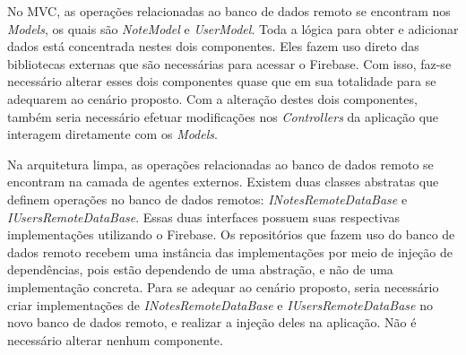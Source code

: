 No MVC, as operações relacionadas ao banco de dados remoto se encontram nos \emph{Models}, os quais são \emph{NoteModel} e \emph{UserModel}.
Toda a lógica para obter e adicionar dados está concentrada nestes dois componentes.
Eles fazem uso direto das bibliotecas externas que são necessárias para acessar o Firebase.
Com isso, faz-se necessário alterar esses dois componentes quase que em sua totalidade para se adequarem ao cenário proposto.
Com a alteração destes dois componentes, também seria necessário efetuar modificações nos \emph{Controllers} da aplicação que interagem diretamente com os \emph{Models}.

Na arquitetura limpa, as operações relacionadas ao banco de dados remoto se encontram na camada de agentes externos.
Existem duas classes abstratas que definem operações no banco de dados remotos: \emph{INotesRemoteDataBase} e \emph{IUsersRemoteDataBase}.
Essas duas interfaces possuem suas respectivas implementações utilizando o Firebase.
Os repositórios que fazem uso do banco de dados remoto recebem uma instância das implementações por meio de injeção de dependências, pois estão dependendo de uma abstração, e não de uma implementação concreta.
Para se adequar ao cenário proposto, seria necessário criar implementações de \emph{INotesRemoteDataBase} e \emph{IUsersRemoteDataBase} no novo banco de dados remoto, e realizar a injeção deles na aplicação.
Não é necessário alterar nenhum componente.